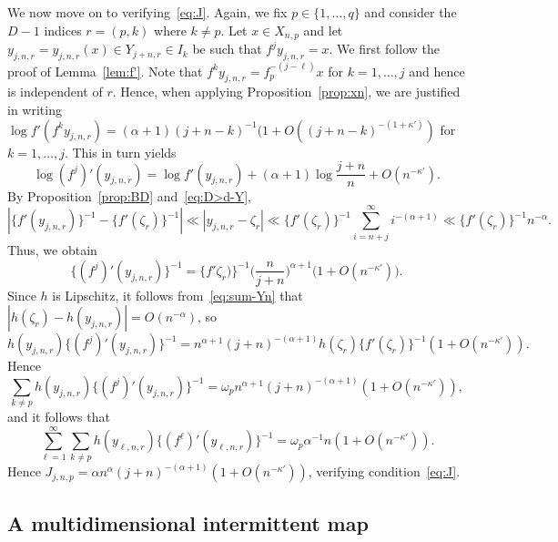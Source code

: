 \documentclass[12pt]{article}
\numberwithin{equation}{section}
\begin{document}
\begin{example}
  We now move on to verifying~\eqref{eq:J}.
        Again, we fix $p\in\{1,\dots,q\}$ and consider the $D-1$ indices
  $r=(p,k)$ where $k\neq p$.
  Let $x\in X_{ n,p }$  and let $y_{j,n,r} = y_{j,n,r}(x) \in Y_{ j + n , r }\in I_k$
  be such that $f^j y_{j,n,r} = x$.
        We first follow the proof of Lemma~\ref{lem:f'}.
Note that $f^ky_{j,n,r}=f_p^{-(j-\ell)}x$ for $k=1,\dots,j$ and hence is independent of $r$.
Hence, when applying Proposition~\ref{prop:xn}, we are justified in writing
        $\log f' (f^k  y_{j,n,r}) = (\alpha + 1) ( j + n - k)^{-1} ( 1 +  O ( (j + n - k)^{ - (1 + \kappa')})$ for $k=1,\dots,j$. This in turn yields 
  \[
    \log (f^j)' (y_{j,n,r})
    = \log f' ( y_{j,n,r})
    + ( \alpha + 1 ) \log \frac{ j + n }{ n } + O ( n^{-\kappa'} )
    .
  \]
  By Proposition~\ref{prop:BD} and~\eqref{eq:D>d-Y},
  \[
	  | \{f'(y_{j,n,r})\}^{ -1 }
    - \{ f' (\zeta_r )\}^{ -1 } |
    \ll | y_{j,n,r} - \zeta_r |
    \ll \{f' (\zeta_r)\}^{-1}\sum_{i = n + j}^\infty i^{ - (\alpha + 1 )}
    \ll \{f' (\zeta_r)\}^{-1} n^{-\alpha}
    .
  \]
  Thus, we obtain
\[
	  \{( f^j )' (y_{j,n,r})\}^{-1}
	  =\{f' \zeta_r )\}^{ -1 } 
	   \Big( \frac{ n }{ j +  n } \Big)^{ \alpha + 1 }
	  \big( 1 + O(n^{ - \kappa'}) \big)
    .
\]
Since $h$ is Lipschitz, it follows from~\eqref{eq:sum-Yn} that
  $|h(\zeta_r) - h ( y_{j,n,r}) | = O ( n^{-\alpha})$, so
  \[
	  h(y_{j,n,r}) \{(f^j)' (y_{j,n,r})\}^{ -1 }
    = n^{ \alpha + 1 } ( j + n )^{ -( \alpha + 1 ) }
    h( \zeta_r ) \{f'( \zeta_r )\}^{ -1 } ( 1 + O(n^{-\kappa'}) )
    .
  \]
  Hence
\[
	  \sum_{k \neq p } h(y_{j,n,r}) \{(f^j)' (y_{j,n,r})\}^{ -1 }
    = \omega_p n^{ \alpha + 1 } ( j + n )^{ -( \alpha + 1 ) } (
      1 +  O(n^{-\kappa'})
    ),
\]
and it follows that
\[
    \sum_{ \ell = 1 }^{ \infty }\sum_{k\neq p} 
	  h(y_{ \ell,n,r }) \{(f^{ \ell })' (y_{ \ell,n,r })\}^{ -1 }
=
    \omega_p \alpha^{ -1 } n ( 1 +  O(n^{-\kappa'})).
\]
       Hence 
$J_{ j,n,p } = \alpha n^{ \alpha } ( j + n )^{ - ( \alpha + 1 ) }( 1 +  O(n^{-\kappa'}))$, verifying condition~\eqref{eq:J}.
\end{example}



\subsection{A multidimensional intermittent map}
\label{sec:EMV}
\end{document}
